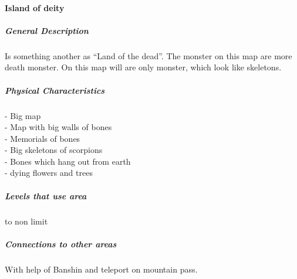 \documentclass[parskip=full]{scrartcl}
\begin{document}
					\paragraph{Island of deity}\vspace{-0.5cm}
						\subparagraph{General Description} \vspace{-0.5cm}
							\par \begingroup
							\leftskip=2cm
							\noindent
									Is something another as “Land of the dead”. The monster on this map are more death monster. On this map will are only monster, which look like skeletons.
							\par \endgroup
						\subparagraph{Physical Characteristics} \vspace{-0.5cm}
							\par \begingroup
							\leftskip=2cm
							\noindent
									- Big map \\
									- Map with big walls of bones \\
									- Memorials of bones \\
									- Big skeletons of scorpions \\
									- Bones which hang out from earth  \\
									- dying flowers and trees 
							\par \endgroup
						\subparagraph{Levels that use area} \vspace{-0.5cm}
							\par \begingroup
							\leftskip=2cm
							 to non limit
							\par \endgroup
						\subparagraph{Connections to other areas} \vspace{-0.5cm}
							\par \begingroup
							\leftskip=2cm
							\noindent
									With help of  Banshin and teleport on mountain pass.
							\par \endgroup
\end{document}
